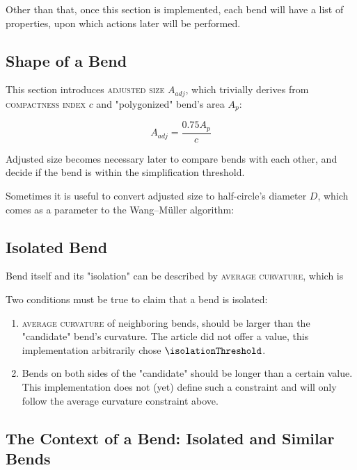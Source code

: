 \documentclass[a4paper]{article}
\newcommand{\WM}{Wang--M{\"u}ller}
\begin{document}
Other than that, once this section is implemented, each bend will have a list
of properties, upon which actions later will be performed.

\subsection{Shape of a Bend}
\label{sec:shape-of-a-bend}

This section introduces \textsc{adjusted size} $A_{adj}$, which trivially
derives from \textsc{compactness index} $c$ and "polygonized" bend's area $A_{p}$:

\[
  A_{adj} = \frac{0.75 A_{p}}{c}
\]

Adjusted size becomes necessary later to compare bends with each other, and
decide if the bend is within the simplification threshold.

Sometimes it is useful to convert adjusted size to half-circle's diameter $D$,
which comes as a parameter to the {\WM} algorithm:

\subsection{Isolated Bend}

Bend itself and its "isolation" can be described by \textsc{average curvature},
which is 

Two conditions must be true to claim that a bend is isolated:

\begin{enumerate}
    \item \textsc{average curvature} of neighboring bends, should be larger
        than the "candidate" bend's curvature. The article did not offer a
        value, this implementation arbitrarily chose $\isolationThreshold$.

    \item Bends on both sides of the "candidate" should be longer than a
        certain value. This implementation does not (yet) define such a
        constraint and will only follow the average curvature constraint above.
\end{enumerate}

\subsection{The Context of a Bend: Isolated and Similar Bends}
\end{document}
